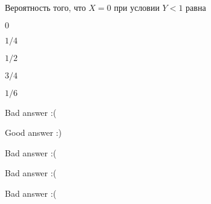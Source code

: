 
\begin{question}
Вероятность того, что \(X=0\) при условии \(Y<1\) равна
\begin{answerlist}
  \item \(0\)
  \item \(1/4\)
  \item \(1/2\)
  \item \(3/4\)
  \item \(1/6\)
\end{answerlist}
\end{question}

\begin{solution}
\begin{answerlist}
  \item Bad answer :(
  \item Good answer :)
  \item Bad answer :(
  \item Bad answer :(
  \item Bad answer :(
\end{answerlist}
\end{solution}

